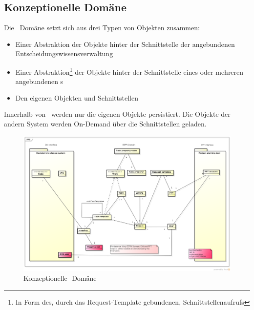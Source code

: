 	
		\subsection{Konzeptionelle Domäne}
			Die \eeppi\ Domäne setzt sich aus drei Typen von Objekten zusammen: 
			\begin{itemize}
				\item Einer Abstraktion der Objekte hinter der Schnittstelle der angebundenen Entscheidungswissensverwaltung
				\item Einer Abstraktion\footnote{In Form des, durch das Request-Template gebundenen, Schnittstellenaufrufs} der Objekte hinter der Schnittstelle eines oder mehreren angebundenen \ppt s
				\item Den eigenen Objekten und Schnittstellen
			\end{itemize}
			
			Innerhalb von \eeppi\ werden nur die eigenen Objekte persistiert.
			Die Objekte der andern System werden On-Demand über die Schnittstellen geladen.
		
			\begin{landscape}
				\begin{figure}[H]
					\includegraphics[width=0.9\linewidth]{architecture/media/img/domain.png}
					\centering
					\caption{Konzeptionelle \eeppi -Domäne}
					\label{fig:domain}
				\end{figure}				
			\end{landscape}
			
